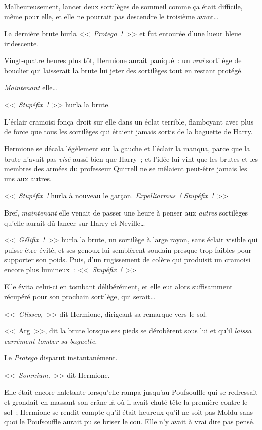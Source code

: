 Malheureusement, lancer deux sortilèges de sommeil comme ça était difficile, même pour elle, et elle ne pourrait pas descendre le troisième avant…

La dernière brute hurla <<~\emph{Protego~!}~>> et fut entourée d'une lueur bleue iridescente.

Vingt-quatre heures plus tôt, Hermione aurait paniqué~: un \emph{vrai} sortilège de bouclier qui laisserait la brute lui jeter des sortilèges tout en restant protégé.

\emph{Maintenant} elle…

<<~\emph{Stupéfix~!}~>> hurla la brute.

L'éclair cramoisi fonça droit sur elle dans un éclat terrible, flamboyant avec plus de force que tous les sortilèges qui étaient jamais sortis de la baguette de Harry.

Hermione se décala légèlement sur la gauche et l'éclair la manqua, parce que la brute n’avait pas \emph{visé} aussi bien que Harry~; et l'idée lui vint que les brutes et les membres des armées du professeur Quirrell ne se mêlaient peut-être jamais les uns aux autres.

<<~\emph{Stupéfix~!} hurla à nouveau le garçon. \emph{Expelliarmus~! Stupéfix~!}~>>

Bref, \emph{maintenant} elle venait de passer une heure à penser aux \emph{autres} sortilèges qu'elle aurait dû lancer sur Harry et Neville…

<<~\emph{Gélifix~!}~>> hurla la brute, un sortilège à large rayon, sans éclair visible qui puisse être évité, et ses genoux lui semblèrent soudain presque trop faibles pour supporter son poids. Puis, d'un rugissement de colère qui produisit un cramoisi encore plus lumineux~: <<~\emph{Stupéfix~!}~>>

Elle évita celui-ci en tombant délibérément, et elle eut alors suffisamment récupéré pour son prochain sortilège, qui serait…

<<~\emph{Glisseo,}~>> dit Hermione, dirigeant sa remarque vers le sol.

<<~Arg~>>, dit la brute lorsque ses pieds se dérobèrent sous lui et qu'il \emph{laissa carrément tomber sa baguette.}

Le \emph{Protego} disparut instantanément.

<<~\emph{Somnium,}~>> dit Hermione.

Elle était encore haletante lorsqu'elle rampa jusqu'au Poufsouffle qui se redressait et grondait en massant son crâne là où il avait chuté tête la première contre le sol~; Hermione se rendit compte qu'il était heureux qu'il ne soit pas Moldu sans quoi le Poufsouffle aurait pu se briser le cou. Elle n'y avait à vrai dire pas pensé.

